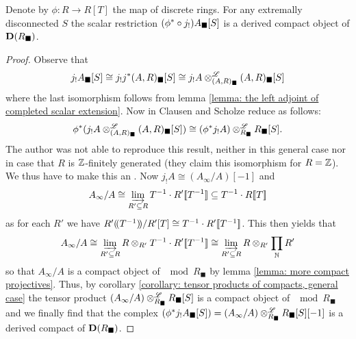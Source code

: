 \begin{lemma}
	\label{lemma: j lower shriek and compact generators}
	
	Denote by $\phi\colon R\to R[T]$ the map of discrete rings. For any extremally disconnected $S$ the scalar restriction $({\phi^\ast} \circ j_!){A_\blacksquare[S]}$ is a derived compact object of ${{\mathbf{D}}(R_\blacksquare)}$.
\end{lemma}
\begin{proof}
	Observe that
		$$j_!{A_\blacksquare[S]}\cong j_!j^\ast{(A, R)_\blacksquare[S]}\cong j_!A\otimes^{\mathscr{L}}_{(A, R)_\blacksquare} {(A, R)_\blacksquare[S]}$$
	where the last isomorphism follows from lemma \ref{lemma: the left adjoint of completed scalar extension}. Now in \cite[Observation 8.12, p.57]{condenseddotpdf} Clausen and Scholze reduce as follows:
		$${\phi^\ast}(j_!A \otimes^{\mathscr{L}}_{(A, R)_\blacksquare} {(A, R)_\blacksquare[S]}) \cong ({\phi^\ast}j_!A) \otimes^{\mathscr{L}}_{R_\blacksquare} {R_\blacksquare[S]}.$$
	The author was not able to reproduce this result, neither in this general case nor in case that $R$ is ${\mathbb{Z}}$-finitely generated (they claim this isomorphism for $R={\mathbb{Z}}$). We thus have to make this an \assumptionPreWord. Now $j_!A \cong (A_\infty/A)[-1]$ and
		$$A_\infty/A \cong \varinjlim_{R'\subseteq R} T^{-1}\cdot {R'[\![T^{-1}]\!]} \subseteq T^{-1}\cdot {R[\![T]\!]}$$
	as for each $R'$ we have ${R'(\!(T^{-1})\!)}/R'[T] \cong T^{-1}\cdot {R'[\![T^{-1}]\!]}$. This then yields that
		$$A_\infty/A \cong \varinjlim_{R'\subseteq R} R\otimes_{R'} T^{-1}\cdot{R'[\![T^{-1}]\!]} \cong \varinjlim_{R'\subseteq R} R\otimes_{R'}\prod_{\mathbb{N}} R'$$
	so that $A_\infty/A$ is a compact object of $\mod{R_\blacksquare}$ by lemma \ref{lemma: more compact projectives}. Thus, by corollary \ref{corollary: tensor products of compacts, general case} the tensor product $(A_\infty/A)\otimes^{\mathscr{L}}_{R_\blacksquare}{R_\blacksquare[S]}$ is a compact object of $\mod{R_\blacksquare}$ and we finally find that the complex $({\phi^\ast}j_! {A_\blacksquare[S]}) = (A_\infty/A)\otimes^{\mathscr{L}}_{R_\blacksquare}{R_\blacksquare[S]}[-1]$ is a derived compact of ${{\mathbf{D}}(R_\blacksquare)}$.
	

\end{proof}
